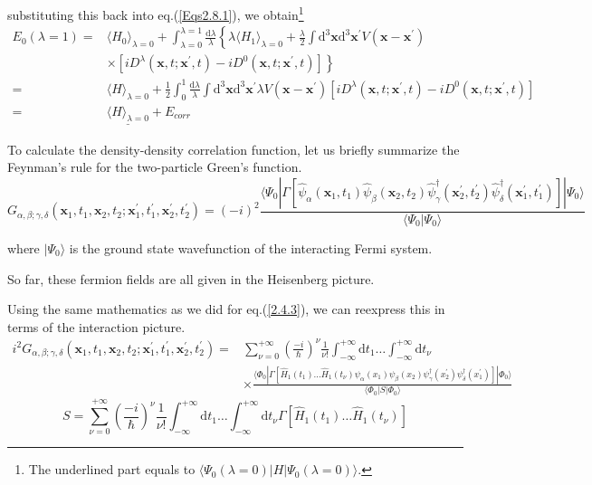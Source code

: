 substituting this back into eq.(\ref{Eqs2.8.1}), we obtain\footnote{The underlined part equals to $\langle \Psi_0(\lambda=0)|H|\Psi_0(\lambda=0)\rangle$.}
\begin{equation} \label{Eqs2.8.3} \begin{split}
E_0(\lambda=1) =& \langle H_0 \rangle_{\lambda=0} + \int_{\lambda=0}^{\lambda=1} \frac{\mathrm{d}\lambda}{\lambda} \left\{ 
\lambda\langle H_1 \rangle_{\lambda=0} + \frac{\lambda}{2}\int \mathrm{d}^3 \mathbf{x} \mathrm{d}^3 \mathbf{x}^{'} V(\mathbf{x}-\mathbf{x}^{'})\right. \\&\left.\times \left[ i D^\lambda(\mathbf{x},t;\mathbf{x}^{'},t)- i D^0(\mathbf{x},t;\mathbf{x}^{'},t)\right] \right\}\\
=& \langle H \rangle_{\lambda=0} + \frac{1}{2}\int_0^1 \frac{\mathrm{d}\lambda}{\lambda} \int \mathrm{d}^3 \mathbf{x} \mathrm{d}^3 \mathbf{x}^{'} \lambda V(\mathbf{x}-\mathbf{x}^{'})\left[ i D^\lambda(\mathbf{x},t;\mathbf{x}^{'},t)- i D^0(\mathbf{x},t;\mathbf{x}^{'},t) \right]\\
=&\underline{\langle H \rangle_{\lambda=0}} + E_{corr}
\end{split} \end{equation}

To calculate the density-density correlation function, let us briefly summarize the Feynman's rule for the two-particle Green's function.
\begin{equation} \label{Eqs2.8.4}
G_{\alpha,\beta;\gamma,\delta}(\mathbf{x}_1,t_1,\mathbf{x}_2,t_2;\mathbf{x}_1^{'},t_1^{'},\mathbf{x}_2^{'},t_2^{'}) = (-i)^2 \frac{\langle \Psi_0 | \Gamma[\hat{\psi}_\alpha(\mathbf{x}_1,t_1) \hat{\psi}_\beta(\mathbf{x}_2, t_2) \hat{\psi}_\gamma^\dagger(\mathbf{x}_2^{'},t_2^{'}) \hat{\psi}_\delta^\dagger(\mathbf{x}_1^{'},t_1^{'})]|\Psi_0\rangle}{\langle \Psi_0 | \Psi_0 \rangle}
\end{equation}

where $| \Psi_0 \rangle$ is the ground state wavefunction of the interacting Fermi system.

So far, these fermion fields are all given in the Heisenberg picture.

Using the same mathematics as we did for eq.(\ref{2.4.3}), we can reexpress this in terms of the interaction picture.
\[ \begin{split} i^2 G_{\alpha,\beta;\gamma,\delta}(\mathbf{x}_1,t_1,\mathbf{x}_2,t_2;\mathbf{x}_1^{'},t_1^{'},\mathbf{x}_2^{'},t_2^{'}) =& \sum_{\nu=0}^{+\infty} \left( \frac{-i}{\hbar} \right)^\nu \frac{1}{\nu!} \int_{-\infty}^{+\infty}\mathrm{d}t_1 \ldots \int_{-\infty}^{+\infty}\mathrm{d}t_\nu \\
&\times \frac{\langle \Phi_0 | \Gamma[\hat{H}_1(t_1)\ldots\hat{H}_1(t_\nu)\psi_\alpha(x_1) \psi_\beta(x_2) \psi_\gamma^\dagger(x_2^{'}) \psi_\delta^\dagger(x_1^{'})]|\Phi_0\rangle}{\langle \Phi_0 | S | \Phi_0  \rangle}
\end{split} \]
\[ S = \sum_{\nu=0}^{+\infty}\left( \frac{-i}{\hbar} \right)^\nu \frac{1}{\nu!} \int_{-\infty}^{+\infty}\mathrm{d}t_1 \ldots \int_{-\infty}^{+\infty}\mathrm{d}t_\nu \Gamma[\hat{H}_1(t_1)\ldots\hat{H}_1(t_\nu)] \]

